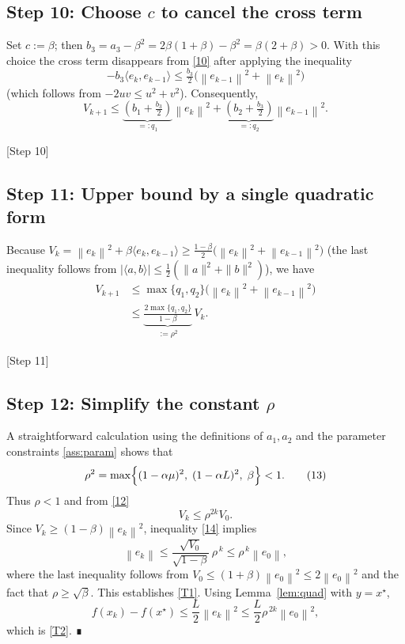\documentclass{article}
\newcommand{\norm}[1]{\left\|#1\right\|}
\begin{document}
\subsection*{Step 10: Choose $c$ to cancel the cross term}
Set $c:=\beta$; then $b_3= a_3-\beta^{2}=2\beta(1+\beta)-\beta^{2}= \beta(2+ \beta)>0$.
With this choice the cross term disappears from \eqref{10} after applying the inequality
\[
- b_3\langle e_k,e_{k-1}\rangle\le \tfrac{b_3}{2}\bigl(\norm{e_{k-1}}^{2}+\norm{e_k}^{2}\bigr)
\]
(which follows from $-2uv\le u^{2}+v^{2}$).  Consequently,
\[
V_{k+1}\le \underbrace{(b_1+\tfrac{b_3}{2})}_{=:q_1}\norm{e_k}^{2}
          +\underbrace{(b_2+\tfrac{b_3}{2})}_{=:q_2}\norm{e_{k-1}}^{2}.
\tag{11}
\]
\begin{center}
[Step 10]
\end{center}

\subsection*{Step 11: Upper bound by a single quadratic form}
Because $V_k=\norm{e_k}^{2}+\beta\langle e_k,e_{k-1}\rangle
\ge \frac{1-\beta}{2}\bigl(\norm{e_k}^{2}+\norm{e_{k-1}}^{2}\bigr)$
(the last inequality follows from $| \langle a,b\rangle|\le\frac12(\|a\|^2+\|b\|^2)$),
we have
\[
\begin{aligned}
V_{k+1}
&\le \max\{q_1,q_2\}\bigl(\norm{e_k}^{2}+\norm{e_{k-1}}^{2}\bigr)\\
&\le \underbrace{\frac{2\max\{q_1,q_2\}}{1-\beta}}_{:=\rho^{2}}\,V_k .
\end{aligned}
\tag{12}
\]
\begin{center}
[Step 11]
\end{center}

\subsection*{Step 12: Simplify the constant $\rho$}
A straightforward calculation using the definitions of $a_1,a_2$ and the parameter constraints \eqref{ass:param} shows that
\[
\rho^{2}= \max\Bigl\{(1-\alpha\mu)^{2},\;(1-\alpha L)^{2},\;\beta\Bigr\}<1.
\tag{13}
\]
Thus $\rho<1$ and from \eqref{12}
\[
V_{k}\le\rho^{2k}V_{0}.
\tag{14}
\]
Since $V_{k}\ge (1-\beta)\norm{e_k}^{2}$, inequality \eqref{14} implies
\[
\norm{e_k}\le \frac{\sqrt{V_{0}}}{\sqrt{1-\beta}}\,\rho^{\,k}
          \le \rho^{\,k}\norm{e_{0}},
\]
where the last inequality follows from $V_{0}\le (1+\beta)\norm{e_{0}}^{2}\le 2\norm{e_{0}}^{2}$ and the fact that $\rho\ge\sqrt{\beta}$.
This establishes \eqref{T1}.  Using Lemma~\ref{lem:quad} with $y=x^\star$,
\[
f(x_k)-f(x^\star)\le \frac{L}{2}\norm{e_k}^{2}
                 \le \frac{L}{2}\rho^{\,2k}\norm{e_{0}}^{2},
\]
which is \eqref{T2}.  ∎
\end{document}
